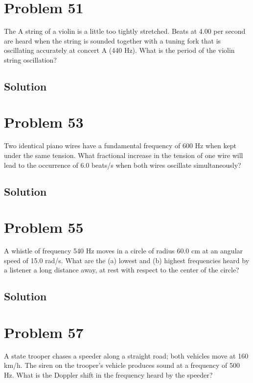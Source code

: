 \documentclass[12pt]{article}
\begin{document}
    \pagebreak
    \section{Problem 51}
        The A string of a violin is a little too tightly stretched. 
        Beats at 4.00 per second are heard when the string is sounded together with a tuning fork that is oscillating accurately at concert A (440 Hz).
        What is the period of the violin string oscillation?

        \subsection{Solution}

    \pagebreak
    \section{Problem 53}
        Two identical piano wires have a fundamental frequency of 600 Hz when kept under the same tension. 
        What fractional increase in the tension of one wire will lead to the occurrence of 6.0 beats/s when both wires oscillate simultaneously?

        \subsection{Solution}

    \pagebreak
    \section{Problem 55}
        A whistle of frequency 540 Hz moves in a circle of radius 60.0 cm at an angular speed of 15.0 rad/s. 
        What are the (a) lowest and (b) highest frequencies heard by a listener a long distance away, at rest with respect to the center of the circle?

        \subsection{Solution}

    \pagebreak
    \section{Problem 57}
        A state trooper chases a speeder along a straight road; both vehicles move at 160 km/h. 
        The siren on the trooper's vehicle produces sound at a frequency of 500 Hz. 
        What is the Doppler shift in the frequency heard by the speeder?
\end{document}
